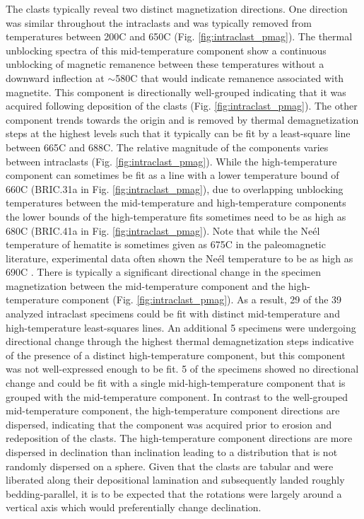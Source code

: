 \documentclass[11pt,letterpaper]{article}
\begin{document}
The clasts typically reveal two distinct magnetization directions. One direction was similar throughout the intraclasts and was typically removed from temperatures between 200\textdegree C and 650\textdegree C (Fig. \ref{fig:intraclast_pmag}). The thermal unblocking spectra of this mid-temperature component show a continuous unblocking of magnetic remanence between these temperatures without a downward inflection at $\sim$580\textdegree C that would indicate remanence associated with magnetite. This component is directionally well-grouped indicating that it was acquired following deposition of the clasts (Fig. \ref{fig:intraclast_pmag}). The other component trends towards the origin and is removed by thermal demagnetization steps at the highest levels such that it typically can be fit by a least-square line between 665\textdegree C and 688\textdegree C. The relative magnitude of the components varies between intraclasts (Fig. \ref{fig:intraclast_pmag}). While the high-temperature component can sometimes be fit as a line with a lower temperature bound of 660\textdegree C (BRIC.31a in Fig. \ref{fig:intraclast_pmag}), due to overlapping unblocking temperatures between the mid-temperature and high-temperature components the lower bounds of the high-temperature fits sometimes need to be as high as 680\textdegree C (BRIC.41a in Fig. \ref{fig:intraclast_pmag}). Note that while the Ne\'el temperature of hematite is sometimes given as 675\textdegree C in the paleomagnetic literature, experimental data often shown the Ne\'el temperature to be as high as 690\textdegree C \citep{Ozdemir2006a}. There is typically a significant directional change in the specimen magnetization between the mid-temperature component and the high-temperature component (Fig. \ref{fig:intraclast_pmag}). As a result, 29 of the 39 analyzed intraclast specimens could be fit with distinct mid-temperature and high-temperature least-squares lines. An additional 5 specimens were undergoing directional change through the highest thermal demagnetization steps indicative of the presence of a distinct high-temperature component, but this component was not well-expressed enough to be fit. 5 of the specimens showed no directional change and could be fit with a single mid-high-temperature component that is grouped with the mid-temperature component. In contrast to the well-grouped mid-temperature component, the high-temperature component directions are dispersed, indicating that the component was acquired prior to erosion and redeposition of the clasts. The high-temperature component directions are more dispersed in declination than inclination leading to a distribution that is not randomly dispersed on a sphere. Given that the clasts are tabular and were liberated along their depositional lamination and subsequently landed roughly bedding-parallel, it is to be expected that the rotations were largely around a vertical axis which would preferentially change declination.
\end{document}
